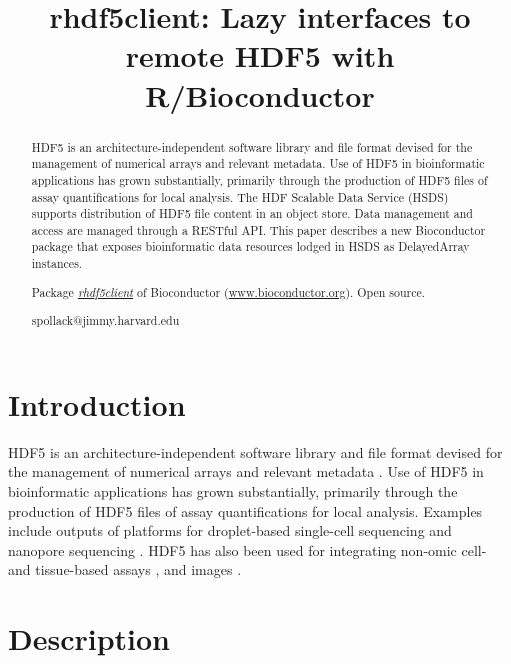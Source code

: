 \documentclass[applications]{gen-bioinformatics}
\author[1]{\pfnm{Samuela}
  \pinit{}
  \psnm{Pollack}}
\author[1]{\pfnm{Shweta}
  \pinit{}
  \psnm{Gopaulakrishnan}}
\author[1]{\pfnm{Benjamin}
  \pinit{}
  \psnm{Stubbs}}
\author[2]{\pfnm{Herv\'e}
  \pinit{}
  \psnm{Pag\`es}}
\author[3]{\pfnm{John}
  \pinit{}
  \psnm{Readey}}
\author[4]{\pfnm{Sean}
  \pinit{}
  \psnm{Davis}}
\author[5]{\pfnm{Levi}
  \pinit{}
  \psnm{Waldron}}
\author[6]{\pfnm{Martin}
  \pinit{T}
  \psnm{Morgan}}
\author[1]{\pfnm{Vincent}
  \pinit{J}
  \psnm{Carey}}
\newcommand{\BiocpackageFirst}[1]{{\emph{\href{https://bioconductor.org/packages/3.8/#1}{#1\textsubscript{\faExternalLink}}}}}
\begin{document}
\title{rhdf5client: Lazy interfaces to remote HDF5 with R/Bioconductor}
\maketitle

\begin{abstract}
\begin{subabstract}[Summary]
HDF5 is an architecture-independent software library and file format
devised for the management of numerical arrays and relevant metadata.
Use of HDF5 in bioinformatic applications has grown substantially,
primarily through the production of HDF5 files of assay quantifications
for local analysis.
The HDF Scalable Data Service (HSDS) supports distribution
of HDF5 file content in an object store.  Data
management and access are managed through a RESTful API.
This paper describes a new Bioconductor package that
exposes
bioinformatic data resources lodged in HSDS as
DelayedArray instances.
\end{subabstract}
\begin{subabstract}[Availability] Package \BiocpackageFirst{rhdf5client} of Bioconductor
 (\url {www.bioconductor.org}). Open source.
\end{subabstract}
\begin{subabstract}[Contact]spollack@jimmy.harvard.edu
\end{subabstract}
\end{abstract}
\section*{Introduction}


HDF5 is an architecture-independent software library and file format
devised for the management of numerical arrays and relevant metadata
\citep{HDFspec}.
Use of HDF5 in bioinformatic applications has grown substantially,
primarily through the production of HDF5 files of assay quantifications
for local analysis.  Examples include outputs of platforms for droplet-based
single-cell sequencing \citep{Zheng2017} and
nanopore sequencing \citep{NanoPage}.
HDF5 has also been used for integrating non-omic cell- 
and tissue-based assays \citep{Millard2011}, and images
\citep{Dougherty2009}.  

\section*{Description}
\end{document}
